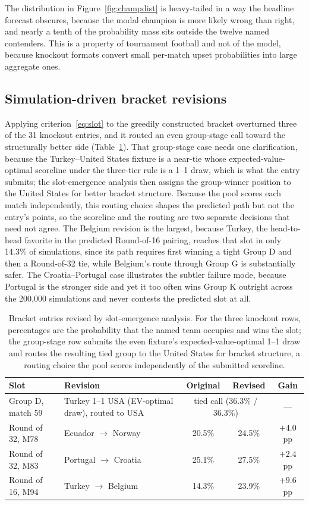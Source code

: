 \documentclass[11pt,a4paper]{article}
\begin{document}
The distribution in Figure~\ref{fig:champdist} is heavy-tailed in a way the headline forecast obscures, because the modal champion is more likely wrong than right, and nearly a tenth of the probability mass sits outside the twelve named contenders. This is a property of tournament football and not of the model, because knockout formats convert small per-match upset probabilities into large aggregate ones.

\subsection{Simulation-driven bracket revisions}

Applying criterion~\eqref{eq:slot} to the greedily constructed bracket overturned three of the 31 knockout entries, and it routed an even group-stage call toward the structurally better side (Table~\ref{tab:revisions}). That group-stage case needs one clarification, because the Turkey--United States fixture is a near-tie whose expected-value-optimal scoreline under the three-tier rule is a 1--1 draw, which is what the entry submits; the slot-emergence analysis then assigns the group-winner position to the United States for better bracket structure. Because the pool scores each match independently, this routing choice shapes the predicted path but not the entry's points, so the scoreline and the routing are two separate decisions that need not agree. The Belgium revision is the largest, because Turkey, the head-to-head favorite in the predicted Round-of-16 pairing, reaches that slot in only 14.3\% of simulations, since its path requires first winning a tight Group D and then a Round-of-32 tie, while Belgium's route through Group G is substantially safer. The Croatia--Portugal case illustrates the subtler failure mode, because Portugal is the stronger side and yet it too often wins Group K outright across the 200{,}000 simulations and never contests the predicted slot at all.

\begin{table}[ht]
\centering\small
\caption{Bracket entries revised by slot-emergence analysis. For the three knockout rows, percentages are the probability that the named team occupies and wins the slot; the group-stage row submits the even fixture's expected-value-optimal 1--1 draw and routes the resulting tied group to the United States for bracket structure, a routing choice the pool scores independently of the submitted scoreline.}
\label{tab:revisions}
\begin{tabular}{llccc}
\toprule
Slot & Revision & Original & Revised & Gain \\
\midrule
Group D, match 59 & Turkey 1--1 USA (EV-optimal draw), routed to USA & \multicolumn{2}{c}{tied call (36.3\% / 36.3\%)} & --- \\
Round of 32, M78 & Ecuador $\to$ Norway & 20.5\% & 24.5\% & $+4.0$ pp \\
Round of 32, M83 & Portugal $\to$ Croatia & 25.1\% & 27.5\% & $+2.4$ pp \\
Round of 16, M94 & Turkey $\to$ Belgium & 14.3\% & 23.9\% & $+9.6$ pp \\
\bottomrule
\end{tabular}
\end{table}
\end{document}
